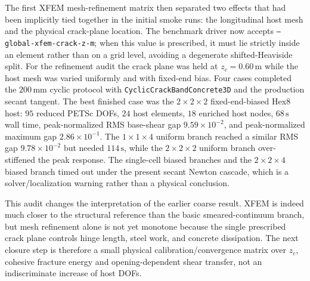 The first XFEM mesh-refinement matrix then separated two effects that had been
implicitly tied together in the initial smoke runs: the longitudinal host mesh
and the physical crack-plane location.  The benchmark driver now accepts
\texttt{--global-xfem-crack-z-m}; when this value is prescribed, it must lie
strictly inside an element rather than on a grid level, avoiding a degenerate
shifted-Heaviside split.  For the refinement audit the crack plane was held at
\(z_c=0.60\,\mathrm{m}\) while the host mesh was varied uniformly and with
fixed-end bias.  Four cases completed the \(200\,\mathrm{mm}\) cyclic protocol
with \texttt{CyclicCrackBandConcrete3D} and the production secant tangent.  The
best finished case was the \(2\times2\times2\) fixed-end-biased Hex8 host:
\(95\) reduced PETSc DOFs, \(24\) host elements, \(18\) enriched host nodes,
\(68\,\mathrm{s}\) wall time, peak-normalized RMS base-shear gap
\(9.59\times10^{-2}\), and peak-normalized maximum gap \(2.86\times10^{-1}\).
The \(1\times1\times4\) uniform branch reached a similar RMS gap
\(9.78\times10^{-2}\) but needed \(114\,\mathrm{s}\), while the \(2\times2\times2\)
uniform branch over-stiffened the peak response.  The single-cell biased
branches and the \(2\times2\times4\) biased branch timed out under the present
secant Newton cascade, which is a solver/localization warning rather than a
physical conclusion.

This audit changes the interpretation of the earlier coarse result.  XFEM is
indeed much closer to the structural reference than the basic smeared-continuum
branch, but mesh refinement alone is not yet monotone because the single
prescribed crack plane controls hinge length, steel work, and concrete
dissipation.  The next closure step is therefore a small physical
calibration/convergence matrix over \(z_c\), cohesive fracture energy and
opening-dependent shear transfer, not an indiscriminate increase of host DOFs.

